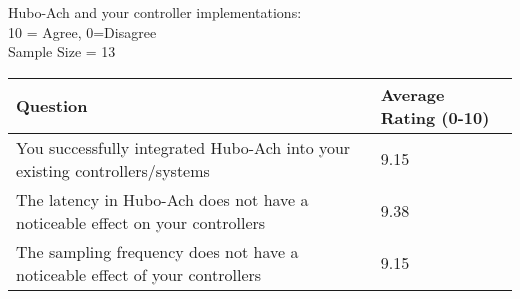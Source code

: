 \begin{table}
\centering
\caption{Q2: Survey on the Unified Algorithmic Framework for Complex System and Humanoids, Hubo-Ach:}\label{table:q2}
Hubo-Ach and your controller implementations:\\
\small
10 = Agree, 0=Disagree\\
Sample Size = 13\\
\normalsize
\begin{longtable}{|p{9cm} | p{3cm} | }
\hline
Question	&	Average Rating (0-10)	\\	\hline
\hline
\hline
You successfully integrated Hubo-Ach into your existing controllers/systems							& 9.15\\
\hline
The latency in Hubo-Ach does not have a noticeable effect on your controllers 							& 9.38\\
\hline
The sampling frequency does not have a noticeable effect of your controllers							& 9.15\\
\hline


\end{longtable}
\end{table}

